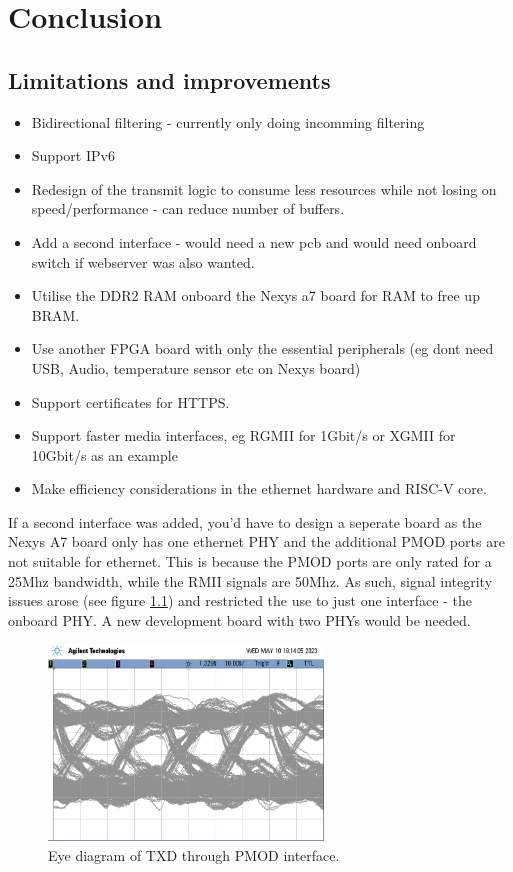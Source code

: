 \chapter[Conclusion]{Conclusion}
\label{Chap:Conclusion}


\section{Limitations and improvements}

\begin{itemize}
    \item Bidirectional filtering - currently only doing incomming filtering
    \item Support IPv6
    \item Redesign of the transmit logic to consume less resources while not losing on speed/performance - can reduce number of buffers. 
    \item Add a second interface - would need a new pcb and would need onboard switch if webserver was also wanted.
    \item Utilise the DDR2 RAM onboard the Nexys a7 board for RAM to free up BRAM. 
    \item Use another FPGA board with only the essential peripherals (eg dont need USB, Audio, temperature sensor etc on Nexys board)
    \item Support certificates for HTTPS. 
    \item Support faster media interfaces, eg RGMII for 1Gbit/s or XGMII for 10Gbit/s as an example
    \item Make efficiency considerations in the ethernet hardware and RISC-V core. 
\end{itemize}


If a second interface was added, you'd have to design a seperate board as the Nexys A7 board only has one ethernet PHY and the additional PMOD ports are not suitable for ethernet. This is because the PMOD ports are only rated for a 25Mhz bandwidth, while the RMII signals are 50Mhz. As such, signal integrity issues arose (see figure \ref{fig:eye_diagram}) and restricted the use to just one interface - the onboard PHY. A new development board with two PHYs would be needed.

\begin{figure}[h]
    \centering
    \includegraphics[width=0.65\textwidth]{Images/EyeDiagramTX.png}
    \caption[Eye diagram of TXD through PMOD interface]{Eye diagram of TXD through PMOD interface.}
    \label{fig:eye_diagram}
\end{figure}




